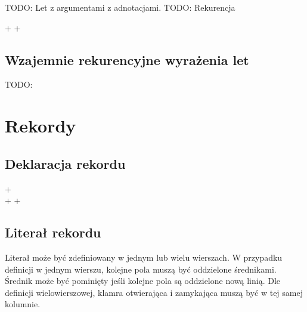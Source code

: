 \documentclass[declaration,shortabstract]{iithesis}
\begin{document}
TODO: Let z argumentami z adnotacjami.
TODO: Rekurencja

\begin{bnf*}
    {  + \bnfts{=}  
      \bnfor {} + \bnfts{=} 
       
    }\\
\end{bnf*}

\subsection{Wzajemnie rekurencyjne wyrażenia let}

TODO: 




\section{Rekordy}

\subsection{Deklaracja rekordu}

\begin{bnf*}
    {   \bnfts{=}  
      +  
    }\\
    {  \bnfts{:} +
       \bnfor {} \bnfts{:} +
      \bnfts{;}
    }\\
\end{bnf*}

\subsection{Literał rekordu}

Literał może być zdefiniowany w jednym lub wielu wierszach. W przypadku 
definicji w jednym wierszu, kolejne pola muszą być oddzielone średnikami. 
Średnik może być pominięty jeśli kolejne pola są oddzielone nową linią. 
Dle definicji wielowierszowej, klamra otwierająca i zamykająca muszą być w tej 
samej kolumnie.
\end{document}
